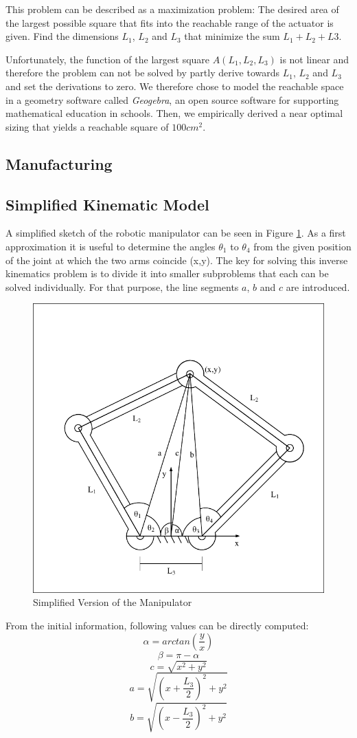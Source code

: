 \documentclass{sig-alternate-05-2015}
\begin{document}
This problem can be described as a maximization problem:
 The desired area of the largest possible square that fits into the reachable range of the actuator is given. Find the dimensions $L_1$, $L_2$ and $L_3$ that minimize the sum $L_1 + L_2 +L3$.
 
 Unfortunately, the function of the largest square $A(L_1, L_2, L_3)$ is not linear and therefore the problem can not be solved by partly derive towards $L_1$, $L_2$ and $L_3$ and set the derivations to zero. 
 We therefore chose to model the reachable space in a geometry software called \emph{Geogebra}, an open source software for supporting mathematical education in schools. Then, we empirically derived a near optimal sizing that yields a reachable square of $100 cm^2$.
\subsection{Manufacturing}
\subsection{Simplified Kinematic Model}\label{section1}

A simplified sketch of the robotic manipulator can be seen in Figure \ref{fig:model}.
As a first approximation it is useful to determine the angles $\theta_1$ to $\theta_4$ from the given position of the joint at which the two arms coincide (x,y). The key for solving this inverse kinematics problem is to divide it into smaller subproblems that each can be solved individually. For that purpose, the line segments $a$, $b$ and $c$ are introduced.
\begin{figure}[!h]
	\label{fig:model}
	\centering
	\includegraphics[width=.42\textwidth]{LinkDiagramSimple_try.pdf}
	\caption{Simplified Version of the Manipulator}
\end{figure}

From the initial information, following values can be directly computed:
\begin{equation}
\alpha = arctan \left( \frac{y}{x} \right)
\end{equation}
\begin{equation}
\beta = \pi - \alpha
\end{equation}
\begin{equation}
c = \sqrt{x^2 + y^2}
\end{equation}
\begin{equation}
a = \sqrt{\left(x+ \frac{L_3}{2}\right)^2 + y^2}
\end{equation}
\begin{equation}
b = \sqrt{\left(x- \frac{L_3}{2}\right)^2 + y^2}
\end{equation}
\end{document}
